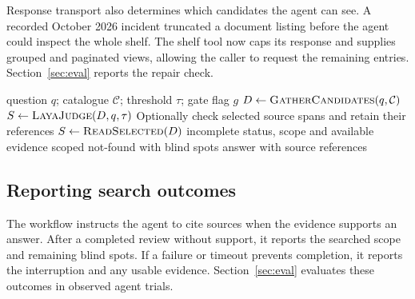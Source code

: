 Response transport also determines which candidates the agent can see.
A recorded October 2026 incident truncated a document listing before the
agent could inspect the whole shelf. The shelf tool now caps its response and
supplies grouped and paginated views, allowing the caller to request the
remaining entries. Section~\ref{sec:eval} reports the repair check.

\begin{algorithm}[tbp]
\caption{Tiered access with optional evidence gate}
\label{alg:tiered}
\begin{algorithmic}[1]
\Require question $q$; catalogue $\mathcal{C}$; threshold $\tau$; gate flag $g$
\State $D \gets \textsc{GatherCandidates}(q,\mathcal{C})$ 
  \State $S \gets \textsc{LayaJudge}(D,q,\tau)$ 
  \State Optionally check selected source spans and retain their references
\Else
  \State $S \gets \textsc{ReadSelected}(D)$
\EndIf
{}
  \State \Return incomplete status, scope and available evidence
  \State \Return scoped not-found with blind spots
\Else
  \State \Return answer with source references
\EndIf
\end{algorithmic}
\end{algorithm}

\subsection{Reporting search outcomes}
The workflow instructs the agent to cite sources when the evidence
supports an answer. After a completed review without support, it reports
the searched scope and remaining blind spots. If a failure or timeout
prevents completion, it reports the interruption and any usable evidence.
Section~\ref{sec:eval} evaluates these outcomes in observed agent trials.
